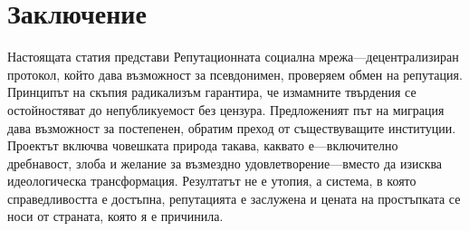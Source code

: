 \documentclass[11pt,a4paper,twocolumn]{article}
\begin{document}
\section{Заключение}

Настоящата статия представи Репутационната социална мрежа---децентрализиран протокол, който дава възможност за псевдонимен, проверяем обмен на репутация. Принципът на скъпия радикализъм гарантира, че измамните твърдения се остойностяват до непубликуемост без цензура. Предложеният път на миграция дава възможност за постепенен, обратим преход от съществуващите институции. Проектът включва човешката природа такава, каквато е---включително дребнавост, злоба и желание за възмездно удовлетворение---вместо да изисква идеологическа трансформация. Резултатът не е утопия, а система, в която справедливостта е достъпна, репутацията е заслужена и цената на простъпката се носи от страната, която я е причинила.


\end{document}
